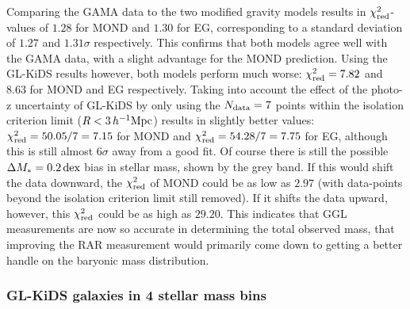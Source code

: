 \documentclass[usenatbib]{mnras}
\newcommand{\hMpc}{\, h^{-1}{\rm{Mpc}} }
\newcommand{\un}[1]{_{\rm #1}}
\newcommand{\dex}{\, {\rm dex}}
\begin{document}
Comparing the GAMA data to the two modified gravity models results in $\chi\un{red}^2$-values of $1.28$ for MOND and $1.30$ for EG, corresponding to a standard deviation of $1.27$ and $1.31 \sigma$ respectively. This confirms that both models agree well with the GAMA data, with a slight advantage for the MOND prediction. Using the GL-KiDS results however, both models perform much worse: $\chi\un{red}^2=7.82$ and $8.63$ for MOND and EG respectively. Taking into account the effect of the photo-z uncertainty of GL-KiDS by only using the $N\un{data}=7$ points within the isolation criterion limit ($R < 3 \hMpc$) results in slightly better values: $\chi\un{red}^2 = 50.05/7 = 7.15$ for MOND and $\chi\un{red}^2 = 54.28/7 = 7.75$ for EG, although this is still almost $6 \sigma$ away from a good fit. Of course there is still the possible $\Delta M_* = 0.2 \dex$ bias in stellar mass, shown by the grey band. If this would shift the data downward, the $\chi\un{red}^2$ of MOND could be as low as $2.97$ (with data-points beyond the isolation criterion limit still removed). If it shifts the data upward, however, this $\chi\un{red}^2$ could be as high as $29.20$. This indicates that GGL measurements are now so accurate in determining the total observed mass, that improving the RAR measurement would primarily come down to getting a better handle on the baryonic mass distribution.


\subsubsection{GL-KiDS galaxies in 4 stellar mass bins}
\end{document}
